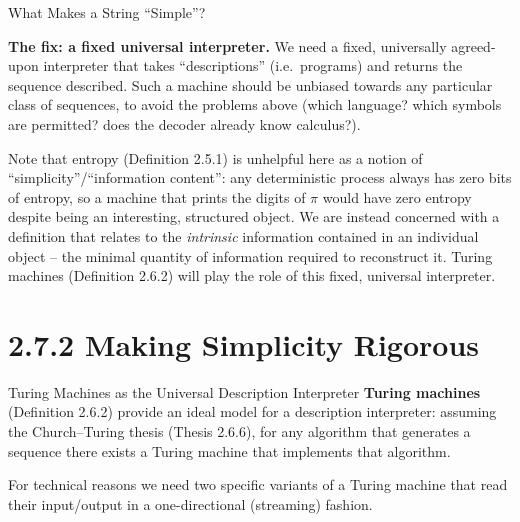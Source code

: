 \documentclass[aspectratio=169,10pt]{beamer}
\begin{document}
\begin{frame}[allowframebreaks]{What Makes a String ``Simple''?}
  \framebreak

  \textbf{The fix: a fixed universal interpreter.} We need a fixed,
  universally agreed-upon interpreter that takes ``descriptions'' (i.e.\
  programs) and returns the sequence described. Such a machine should be
  unbiased towards any particular class of sequences, to avoid the
  problems above (which language? which symbols are permitted? does the
  decoder already know calculus?).

  \medskip
  Note that entropy (Definition 2.5.1) is unhelpful here as a notion of
  ``simplicity''/``information content'': any deterministic process always
  has zero bits of entropy, so a machine that prints the digits of $\pi$
  would have zero entropy despite being an interesting, structured object.
  We are instead concerned with a definition that relates to the
  \emph{intrinsic} information contained in an individual object -- the
  minimal quantity of information required to reconstruct it. Turing
  machines (Definition 2.6.2) will play the role of this fixed, universal
  interpreter.
\end{frame}

\section{2.7.2 Making Simplicity Rigorous}

\begin{frame}{Turing Machines as the Universal Description Interpreter}
  \textbf{Turing machines} (Definition 2.6.2) provide an ideal model for a
  description interpreter: assuming the Church--Turing thesis (Thesis
  2.6.6), for any algorithm that generates a sequence there exists a Turing
  machine that implements that algorithm.

  \medskip
  For technical reasons we need two specific variants of a Turing machine
  that read their input/output in a one-directional (streaming) fashion.
\end{frame}
\end{document}
